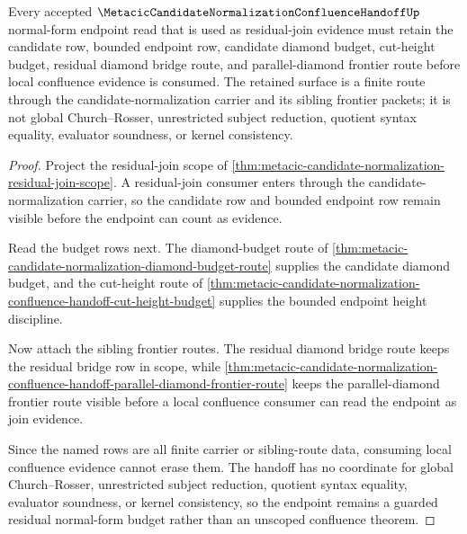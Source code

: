 \begin{theorem}
\label{thm:metacic-candidate-normalization-confluence-handoff-residual-normal-form-budget}
Every accepted $\MetacicCandidateNormalizationConfluenceHandoffUp$ normal-form endpoint read that is used as residual-join evidence must retain the candidate row, bounded endpoint row, candidate diamond budget, cut-height budget, residual diamond bridge route, and parallel-diamond frontier route before local confluence evidence is consumed. The retained surface is a finite route through the candidate-normalization carrier and its sibling frontier packets; it is not global Church--Rosser, unrestricted subject reduction, quotient syntax equality, evaluator soundness, or kernel consistency.
\end{theorem}
\begin{proof}
Project the residual-join scope of \autoref{thm:metacic-candidate-normalization-residual-join-scope}. A residual-join consumer enters through the candidate-normalization carrier, so the candidate row and bounded endpoint row remain visible before the endpoint can count as evidence.

Read the budget rows next. The diamond-budget route of \autoref{thm:metacic-candidate-normalization-diamond-budget-route} supplies the candidate diamond budget, and the cut-height route of \autoref{thm:metacic-candidate-normalization-confluence-handoff-cut-height-budget} supplies the bounded endpoint height discipline.

Now attach the sibling frontier routes. The residual diamond bridge route keeps the residual bridge row in scope, while \autoref{thm:metacic-candidate-normalization-confluence-handoff-parallel-diamond-frontier-route} keeps the parallel-diamond frontier route visible before a local confluence consumer can read the endpoint as join evidence.

Since the named rows are all finite carrier or sibling-route data, consuming local confluence evidence cannot erase them. The handoff has no coordinate for global Church--Rosser, unrestricted subject reduction, quotient syntax equality, evaluator soundness, or kernel consistency, so the endpoint remains a guarded residual normal-form budget rather than an unscoped confluence theorem.
\end{proof}
